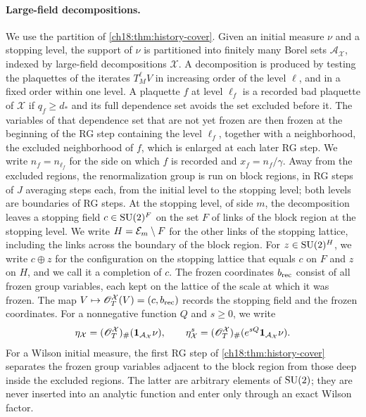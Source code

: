 \paragraph{Large-field decompositions.}
We use the partition of \cref{ch18:thm:history-cover}. Given an initial measure $\nu$ and a stopping level, the support of $\nu$ is partitioned into finitely many Borel sets $\mathcal A_{\mathcal X}$, indexed by large-field decompositions $\mathcal X$. A decomposition is produced by testing the plaquettes of the iterates $T_M^\ell V$ in increasing order of the level $\ell$, and in a fixed order within one level. A plaquette $f$ at level $\ell_f$ is a recorded bad plaquette of $\mathcal X$ if $q_f\ge d_*$ and its full dependence set avoids the set excluded before it. The variables of that dependence set that are not yet frozen are then frozen at the beginning of the RG step containing the level $\ell_f$, together with a neighborhood, the excluded neighborhood of $f$, which is enlarged at each later RG step. We write $n_f=n_{\ell_f}$ for the side on which $f$ is recorded and $x_f=n_f/\gamma$. Away from the excluded regions, the renormalization group is run on block regions, in RG steps of $J$ averaging steps each, from the initial level to the stopping level; both levels are boundaries of RG steps. At the stopping level, of side $m$, the decomposition leaves a stopping field $c\in\mathrm{SU}(2)^F$ on the set $F$ of links of the block region at the stopping level. We write $H=\mathcal E_{m}\setminus F$ for the other links of the stopping lattice, including the links across the boundary of the block region. For $z\in\mathrm{SU}(2)^H$, we write $c\oplus z$ for the configuration on the stopping lattice that equals $c$ on $F$ and $z$ on $H$, and we call it a completion of $c$. The frozen coordinates $b_{\mathrm{rec}}$ consist of all frozen group variables, each kept on the lattice of the scale at which it was frozen. The map $V\mapsto\mathscr O_T^{\mathcal X}(V)=(c,b_{\mathrm{rec}})$ records the stopping field and the frozen coordinates. For a nonnegative function $Q$ and $s\ge0$, we write
\[
 \eta_{\mathcal X}=(\mathscr O_T^{\mathcal X})_\#(\mathbf 1_{\mathcal A_{\mathcal X}}\nu),
 \qquad
 \eta_{\mathcal X}^s=(\mathscr O_T^{\mathcal X})_\#(e^{sQ}\mathbf 1_{\mathcal A_{\mathcal X}}\nu).
\]
For a Wilson initial measure, the first RG step of \cref{ch18:thm:history-cover} separates the frozen group variables adjacent to the block region from those deep inside the excluded regions. The latter are arbitrary elements of $\mathrm{SU}(2)$; they are never inserted into an analytic function and enter only through an exact Wilson factor.

